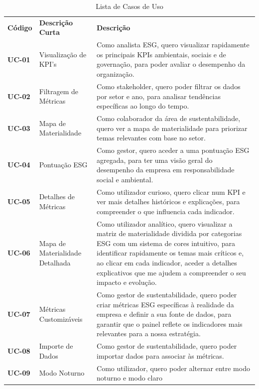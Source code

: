 \begin{table}[H]
    \renewcommand{\arraystretch}{1.2}
    \setlength{\tabcolsep}{10pt}
    \centering
    \begin{tabular}{>{\bfseries}p{3.5cm} p{4cm} p{7cm}}
        \rowcolor{orange!50}
        Código & \textbf{Descrição Curta} & \textbf{Descrição} \\
        UC-01 & Visualização de KPI's & Como analista ESG, quero visualizar rapidamente os principais KPIs ambientais, sociais e de governação, para poder avaliar o desempenho da organização. \\
        UC-02 & Filtragem de Métricas & Como stakeholder, quero poder filtrar os dados por setor e ano, para analisar tendências específicas ao longo do tempo. \\
        UC-03 & Mapa de Materialidade & Como colaborador da área de sustentabilidade, quero ver a mapa de materialidade para priorizar temas relevantes com base no setor. \\
        UC-04 & Pontuação ESG & Como gestor, quero aceder a uma pontuação ESG agregada, para ter uma visão geral do desempenho da empresa em responsabilidade social e ambiental. \\
        UC-05 & Detalhes de Métricas & Como utilizador curioso, quero clicar num KPI e ver mais detalhes históricos e explicações, para compreender o que influencia cada indicador. \\
        UC-06 & Mapa de Materialidade Detalhada & Como utilizador analítico, quero visualizar a matriz de materialidade dividida por categorias ESG com um sistema de cores intuitivo, para identificar rapidamente os temas mais críticos e, ao clicar em cada indicador, aceder a detalhes explicativos que me ajudem a compreender o seu impacto e evolução. \\
        UC-07 & Métricas Customizáveis & Como gestor de sustentabilidade, quero poder criar métricas ESG específicas à realidade da empresa e definir a sua fonte de dados, para garantir que o painel reflete os indicadores mais relevantes para a nossa estratégia. \\
        UC-08 & Importe de Dados & Como gestor de sustentabilidade, quero poder importar dados para associar às métricas. \\
        UC-09 & Modo Noturno & Como utilizador, quero poder alternar entre modo noturno e modo claro \\        
    \end{tabular}
    \caption{Lista de Casos de Uso}
    \label{tab:use_cases}
\end{table}

